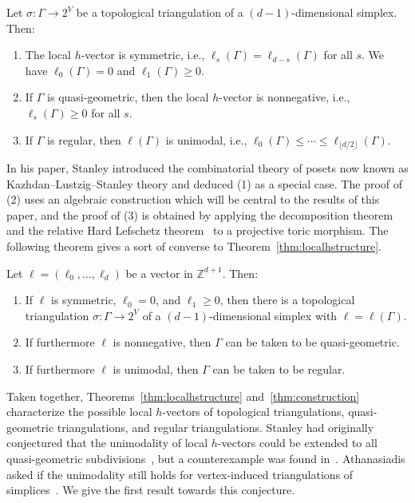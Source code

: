 \begin{theo}\label{thm:localhstructure}
Let $\sigma \colon \Gamma \to 2^V$ be a topological triangulation of a $(d-1)$-dimensional simplex. Then:
\begin{enumerate}
\item The local $h$-vector is symmetric, i.e., $\ell_s(\Gamma) = \ell_{d-s}(\Gamma)$ for all $s$. We have $\ell_0(\Gamma) = 0$ and $\ell_1(\Gamma) \ge 0$.
\item If $\Gamma$ is quasi-geometric, then the local $h$-vector is nonnegative, i.e., $\ell_s(\Gamma) \ge 0$ for all $s$. 
\item If $\Gamma$ is regular, then $\ell(\Gamma)$ is unimodal, i.e., $\ell_0(\Gamma) \le \dotsb \le \ell_{\lfloor d/2 \rfloor}(\Gamma)$. 
\end{enumerate}
\end{theo}

In his paper, Stanley introduced the combinatorial theory of posets now known as Kazhdan--Lustzig--Stanley theory and deduced (1) as a special case.
The proof of (2) uses an algebraic construction which will be central to the results of this paper, and the proof of (3) is obtained by applying the decomposition theorem and the relative Hard Lefschetz theorem~\cite{BBDG} to a projective toric morphism. 
The following theorem gives a sort of converse to Theorem~\ref{thm:localhstructure}. 

\begin{theo}\label{thm:construction}
Let $\ell = (\ell_0, \dotsc, \ell_d)$ be a vector in $\mathbb{Z}^{d+1}$. Then:
\begin{enumerate}
\item If $\ell$ is symmetric, $\ell_0 = 0$, and $\ell_1 \ge 0$, then there is a topological triangulation $\sigma \colon \Gamma \to 2^V$ of a $(d-1)$-dimensional simplex with $\ell = \ell(\Gamma)$. 
\item If furthermore $\ell$ is nonnegative, then $\Gamma$ can be taken to be quasi-geometric. 
\item If furthermore $\ell$ is unimodal, then $\Gamma$ can be taken to be regular. 
\end{enumerate}
\end{theo}

Taken together, Theorems~\ref{thm:localhstructure} and~\ref{thm:construction} characterize the possible local $h$-vectors of topological triangulations, quasi-geometric triangulations, and regular triangulations. 
Stanley had originally conjectured that the unimodality of local $h$-vectors could be extended to all quasi-geometric subdivisions~\cite[Conjecture 5.4]{Stanleylocalh}, but a counterexample 
was found in~\cite[Example 3.4]{AthanasiadisFlag}. Athanasiadis asked if the unimodality still holds for vertex-induced triangulations of simplices~\cite[Question 3.5]{AthanasiadisFlag}. We give the first result towards this conjecture. 


